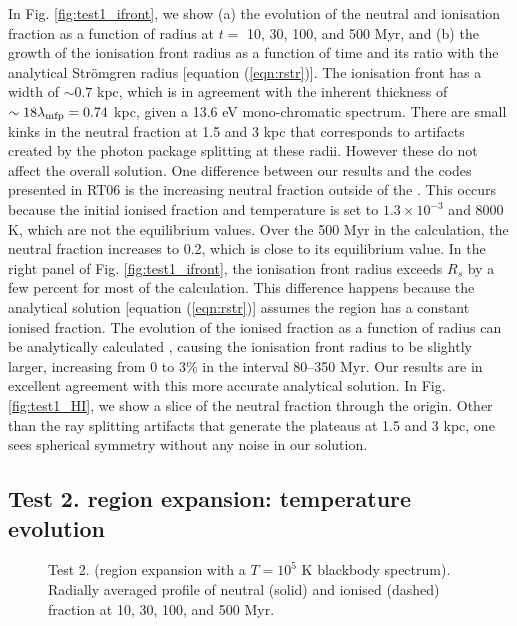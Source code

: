 \documentclass[useAMS,usenatbib]{mn2e}
\begin{document}
In Fig. \ref{fig:test1_ifront}, we show (a) the evolution of the
neutral and ionisation fraction as a function of radius at $t = $ 10,
30, 100, and 500 Myr, and (b) the growth of the ionisation front
radius as a function of time and its ratio with the analytical
Str\"{o}mgren radius [equation (\ref{eqn:rstr})].  The ionisation
front has a width of $\sim0.7$ kpc, which is in agreement with the
inherent thickness of $\sim18 \lambda_{\rm mfp} = 0.74$ kpc, given a
13.6 eV mono-chromatic spectrum.  There are small kinks in the neutral
fraction at 1.5 and 3 kpc that corresponds to artifacts created by the
photon package splitting at these radii.  However these do not affect
the overall solution.  One difference between our results and the
codes presented in RT06 is the increasing neutral fraction outside of
the \hii.  This occurs because the initial ionised fraction and
temperature is set to $1.3 \times 10^{-3}$ and 8000 K, which are not
the equilibrium values.  Over the 500 Myr in the calculation, the
neutral fraction increases to 0.2, which is close to its equilibrium
value.  In the right panel of Fig. \ref{fig:test1_ifront}, the
ionisation front radius exceeds $R_s$ by a few percent for most of the
calculation.  This difference happens because the analytical solution
[equation (\ref{eqn:rstr})] assumes the \hii region has a constant
ionised fraction.  The evolution of the ionised fraction as a function
of radius can be analytically calculated \citep[e.g.][]{Osterbrock89,
  Petkova09}, causing the ionisation front radius to be slightly
larger, increasing from 0 to 3\% in the interval 80--350 Myr.  Our
results are in excellent agreement with this more accurate analytical
solution.  In Fig. \ref{fig:test1_HI}, we show a slice of the neutral
fraction through the origin.  Other than the ray splitting artifacts
that generate the plateaus at 1.5 and 3 kpc, one sees spherical
symmetry without any noise in our solution.

\subsection{Test 2. \hii region expansion: temperature evolution}

\begin{figure}
  \caption{\label{fig:test2_1a} Test 2. (\hii region expansion with a
    $T=10^5$ K blackbody spectrum).  Radially averaged profile of
    neutral (solid) and ionised (dashed) fraction at 10, 30, 100, and
    500 Myr.}
\end{figure}
\end{document}
